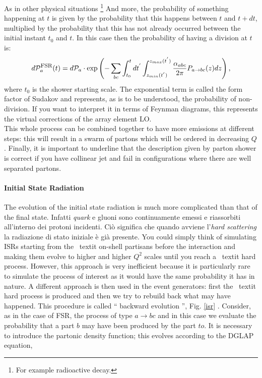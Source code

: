 As in other physical situations \footnote{For example radioactive decay.} And more, the probability of something happening at $ t $ is given by the probability that this happens between $ t $ and $ t + dt $, multiplied by the probability that this has not already occurred between the initial instant $ t_0 $ and $ t $.
In this case then the probability of having a division at $ t $ is:
\begin{equation}
 d \mathcal{P}_{a}^{\mbox{\footnotesize{FSR}}}(t)=   d \mathcal{P}_{a} \cdot \mbox{exp} \left(   -\sum_{bc} \int_{t_0}^t dt^{'}  \int_{z_{min}(t^{'})}^{{z_{max}(t^{'})}} \frac{\alpha_{abc}}{2 \pi} P_{a \rightarrow bc}(z) dz \right) \mbox{,}\end{equation}
where $t_{0}$ is the shower starting scale. 
The exponential term is called the form factor of Sudakov and represents, as is to be understood, the probability of non-division. 
If you want to interpret it in terms of Feynman diagrams, this represents the virtual corrections of the array element LO. \\
This whole process can be combined together to have more emissions at different steps: this will result in a swarm of partons which will be ordered in decreasing $ Q $. Finally, it is important to underline that the description given by parton shower is correct if you have collinear jet and fail in configurations where there are well separated partons.   

\paragraph{Initial State Radiation}
The evolution of the initial state radiation is much more complicated than that of the final state. 
Infatti \textit{quark} e gluoni sono continuamente emessi e riassorbiti all'interno dei protoni incidenti. Ciò significa che quando avviene l'\textit{hard scattering} la radiazione di stato iniziale è già presente.
You could simply think of simulating ISRs starting from the \ textit {on-shell} partisans before the interaction and making them evolve to higher and higher $ Q ^ 2 $ scales until you reach a \ textit {hard process}.
However, this approach is very inefficient because it is particularly rare to simulate the process of interest as it would have the same probability it has in nature. A different approach is then used in the event generators: first the \ textit {hard process} is produced and then we try to rebuild back what may have happened. This procedure is called `` backward evolution '', Fig. \ref{isr} .
Consider, as in the case of FSR, the process of type $ a \rightarrow bc $ and in this case we evaluate the probability that a part $ b $ may have been produced by the part $ to $. It is necessary to introduce the partonic density function; this evolves according to the DGLAP \cite{Altarelli: 1977zs} equation,

